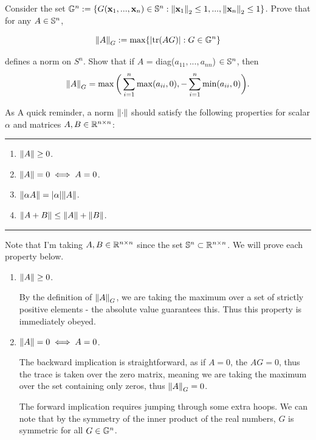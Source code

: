 Consider the set $\G^n := \{G(\textbf{x}_1, ..., \textbf{x}_n) \in \S^n : \norm{\textbf{x}_1}_2 \leq 1, ..., \norm{\textbf{x}_n}_2 \leq 1 \}$. Prove that for any $A \in \S^n$,

\[
\norm{A}_G := \max \{ |\text{tr}(AG)| : G \in \G^n \}
\]

defines a norm on $S^n$. Show that if $A$ = diag($a_{11}, ..., a_{nn}$) $\in \S^n$, then 
\[
\norm{A}_G = \max\bigg( \sum_{i = 1}^n \max (a_{ii}, 0), -\sum_{i = 1}^n \min (a_{ii}, 0)\bigg).
\]

\partbreak
\begin{solution}

    As A quick reminder, a norm $\norm{\cdot}$ should satisfy the following properties for scalar $\alpha$ and matrices $A, B \in \R^{n\times n}$:
    \jump
    \hrule
    \begin{enumerate}[(1)]
        \item $\norm{A} \geq 0$.
        \item $\norm{A} = 0 \iff A = 0$.
        \item $\norm{\alpha A} = |\alpha| \norm{A}$.
        \item $\norm{A + B} \leq \norm{A} + \norm{B}$.
    \end{enumerate}
    \hrule
    \jump
    Note that I'm taking $A, B \in \R^{n\times n}$ since the set $\S^n \subset \R^{n\times n}$. We will prove each property below.

    \begin{enumerate}[(1)]
        \item $\norm{A} \geq 0$.

        By the definition of $\norm{A}_G$, we are taking the maximum over a set of strictly positive elements - the absolute value guarantees this. Thus this property is immediately obeyed.

        \jump
        \item $\norm{A} = 0 \iff A = 0$.

        The backward implication is straightforward, as if $A = 0$, the $AG = 0$, thus the trace is taken over the zero matrix, meaning we are taking the maximum over the set containing only zeros, thus $\norm{A}_G = 0$.

        The forward implication requires jumping through some extra hoops. We can note that by the symmetry of the inner product of the real numbers, $G$ is symmetric for all $G \in \G^n$. 

            
    \end{enumerate}
\end{solution}
\newpage
